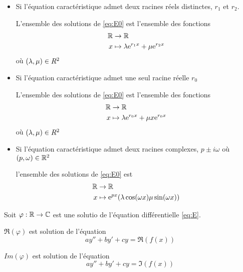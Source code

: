 \begin{thm}
\begin{itemize}
    \item Si l'équation caractéristique admet deux racines réels
        distinctes, $r_1$ et $r_2$.

        L'ensemble des solutions de \eqref{eq:E0} est l'ensemble des
        fonctions
        \begin{align*}
            \mathbb{R} &\to \mathbb{R} \\
            x &\mapsto \lambda \mathrm{e}^{r_1 x} + \mu \mathrm{e}^{r_2 x}
        \end{align*}
        où $(\lambda, \mu) \in \\R^2$
    \item Si l'équation caractéristique admet une seul racine réelle
        $r_0$

        L'ensemble des solutions de \eqref{eq:E0} est l'ensemble des
        fonctions
        \begin{align*}
            \mathbb{R} &\to \mathbb{R} \\
            x &\mapsto \lambda \mathrm{e}^{r_0 x} + \mu x \mathrm{e}^{r_0 x}
        \end{align*}
        où $(\lambda, \mu) \in \\R^2$
    \item Si l'équation caractéristique admet deux racines complexes,
        $p \pm i \omega$ où $(p, \omega) \in \mathbb{R}^2$

        l'ensemble des solutions de \eqref{eq:E0} est
        \begin{align*}
            \mathbb{R} &\to \mathbb{R} \\
            x &\mapsto \mathrm{e}^{p x} (\lambda \cos (\omega x) \mu \sin (\omega x))
        \end{align*}
\end{itemize}
\end{thm}

\begin{prp}
Soit $\varphi : \mathbb{R} \to \mathbb{C}$ est une solutio de l'équation différentielle
\eqref{eq:E}.

$\Re(\varphi)$ est solution de l'équation
\begin{equation}
    a y'' + b y' + c y = \Re(f(x))
\end{equation}

$Im(\varphi)$ est solution de l'équation
\begin{equation}
    a y'' + b y' + c y = \Im(f(x))
\end{equation}
\end{prp}

